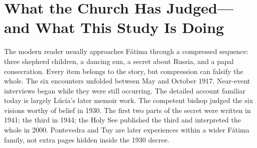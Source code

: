 \section{What the Church Has Judged---and What This Study Is Doing}


The modern reader usually approaches Fátima through a compressed sequence: three shepherd children, a dancing sun, a secret about Russia, and a papal consecration. Every item belongs to the story, but compression can falsify the whole. The six encounters unfolded between May and October 1917. Near-event interviews began while they were still occurring. The detailed account familiar today is largely Lúcia's later memoir work. The competent bishop judged the six visions worthy of belief in 1930. The first two parts of the secret were written in 1941; the third in 1944; the Holy See published the third and interpreted the whole in 2000. Pontevedra and Tuy are later experiences within a wider Fátima family, not extra pages hidden inside the 1930 decree.

